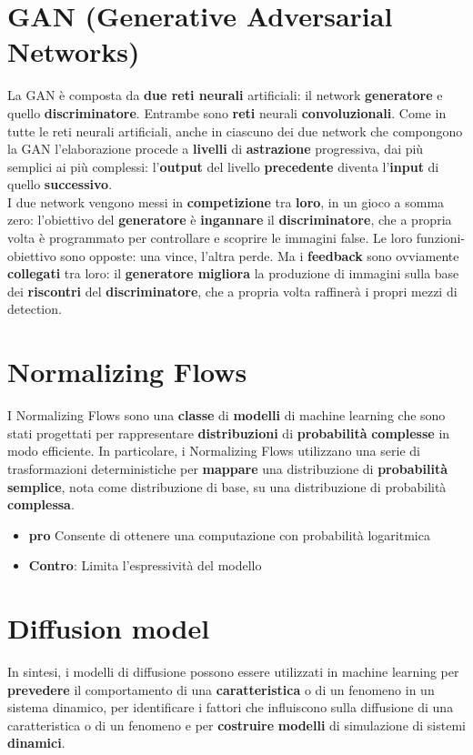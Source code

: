 \documentclass{article}
\begin{document}
\section{GAN (Generative Adversarial Networks)}
La GAN è composta da \textbf{due reti neurali} artificiali: il network \textbf{generatore} e quello \textbf{discriminatore}. Entrambe sono \textbf{reti} neurali \textbf{convoluzionali}. Come in tutte le reti neurali artificiali, anche in ciascuno dei due network che compongono la GAN l’elaborazione procede a \textbf{livelli} di \textbf{astrazione} progressiva, dai più semplici ai più complessi: l’\textbf{output} del livello \textbf{precedente} diventa l’\textbf{input} di quello \textbf{successivo}.\\
I due network vengono messi in \textbf{competizione} tra \textbf{loro}, in un gioco a somma zero: l’obiettivo del \textbf{generatore} è \textbf{ingannare} il \textbf{discriminatore}, che a propria volta è programmato per controllare e scoprire le immagini false. Le loro funzioni-obiettivo sono opposte: una vince, l’altra perde. Ma i \textbf{feedback} sono ovviamente \textbf{collegati} tra loro: il \textbf{generatore migliora} la produzione di immagini sulla base dei \textbf{riscontri} del \textbf{discriminatore}, che a propria volta raffinerà i propri mezzi di detection.


\section{Normalizing Flows}
I Normalizing Flows sono una \textbf{classe} di \textbf{modelli} di machine learning che sono stati progettati per rappresentare \textbf{distribuzioni} di \textbf{probabilità} \textbf{complesse} in modo efficiente. In particolare, i Normalizing Flows utilizzano una serie di trasformazioni deterministiche per \textbf{mappare} una distribuzione di \textbf{probabilità} \textbf{semplice}, nota come distribuzione di base, su una distribuzione di probabilità \textbf{complessa}.\\
\begin{itemize}
    \item \textbf{pro} Consente di ottenere una computazione con probabilità logaritmica
    \item \textbf{Contro}: Limita l'espressività del modello
\end{itemize}

\section{Diffusion model}
In sintesi, i modelli di diffusione possono essere utilizzati in machine learning per \textbf{prevedere} il comportamento di una \textbf{caratteristica} o di un fenomeno in un sistema dinamico, per identificare i fattori che influiscono sulla diffusione di una caratteristica o di un fenomeno e per \textbf{costruire} \textbf{modelli} di simulazione di sistemi \textbf{dinamici}.
\end{document}
